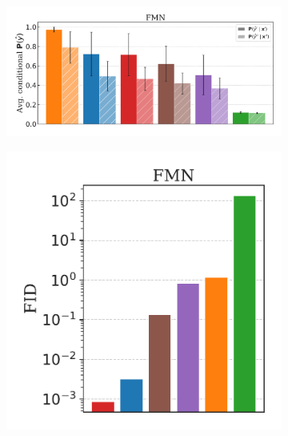 \begin{figure}[H]
    \begin{subfigure}[b]{0.5\textwidth}
        \centering
        \includegraphics[width=\textwidth]{img/results_discussion/adversarial/2_FMN_thesis2.pdf}
    \end{subfigure}
    \hfill
    \begin{subfigure}[b]{0.23\textwidth}
        \centering
        \includegraphics[width=\textwidth]{img/results_discussion/adversarial/FID_barplot_FMN_300.pdf}
    \end{subfigure}
    \begin{subfigure}[b]{0.23\textwidth}
        \centering

\end{subfigure}
\end{figure}
